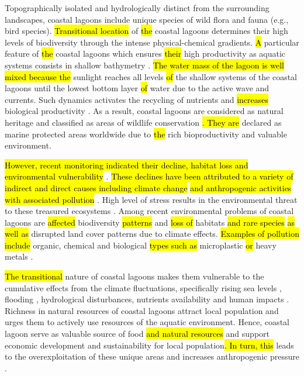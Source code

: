 \documentclass[jmse,article,submit,pdftex,moreauthors]{Definitions/mdpi}
\begin{document}
Topographically isolated and hydrologically distinct from the surrounding landscapes, coastal lagoons include unique species of wild flora and fauna (e.g., bird species). \hl{Transitional location} of \hl{the} coastal lagoons determines their high levels of biodiversity through the intense physical-chemical gradients. \hl{A} particular feature of \hl{the }coastal lagoons which ensures \hl{their} high productivity as aquatic systems consists in shallow bathymetry \cite{PEREZRUZAFA2024171264}. \hl{The water mass of the lagoon is well mixed because the} sunlight reaches all levels \hl{of }the shallow systems of the coastal lagoons until the lowest bottom layer \hl{of} water due to the active wave and currents. Such dynamics activates the recycling of nutrients and \hl{increases} biological productivity \cite{Kennish2016}. As a result, coastal lagoons are considered as natural heritage and classified as areas of wildlife conservation \cite{HERBERT2020631,Nazneen2022}\hl{. They are} declared as marine protected areas worldwide due to \hl{the} rich bioproductivity and valuable environment. 

\hl{However, recent monitoring indicated their decline, habitat loss and environmental vulnerability} \cite{BASTOS2023102144,SUWANDHAHANNADI2024107069,MOHAPATRA2023163109}. \hl{These declines have been attributed to a variety of indirect and direct causes including climate change} \cite{SIMANTIRIS2023108231} \hl{and anthropogenic activities with associated pollution} \cite{GHANDOURAH2023102982}. High level of\hl{ }stress results in the environmental threat to these treasured ecosystems \cite{Davis}. Among recent environmental problems of coastal lagoons are \hl{affected }biodiversity \hl{patterns }and \hl{loss of }habitats \hl{and rare species} \cite{Kumari2022}\hl{ as well as} disrupted land cover patterns due to climate effects. \hl{Examples of pollution include }organic, chemical and biological \hl{types such as } microplastic \cite{GARCESORDONEZ2022120366,BRUSCHI2023110596}\hl{ or} heavy metals \cite{Tripathi2022}. 

\hl{The transitional} nature of coastal lagoons makes them vulnerable to the cumulative effects from the climate fluctuations, specifically rising sea levels \cite{CARRASCO2016356}, flooding \cite{INACIO2023100491}, hydrological disturbances, nutrients availability \cite{LUNARDINI2000135} and human impacts \cite{Luglie}. Richness in natural resources of coastal lagoons attract local population and urges them to actively use resources of the aquatic environment. Hence, coastal lagoon serve as valuable source of food \hl{and natural resources }and support\hl{ }economic development and sustainability for local population\hl{. In turn, this} leads to the overexploitation of these unique areas and increases anthropogenic pressure \cite{PAULY1994377}. 
\end{document}
